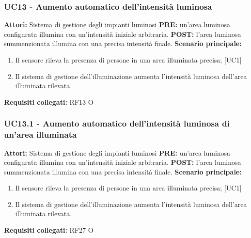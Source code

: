 \documentclass[a4paper, 12pt]{article}
\begin{document}
\subsubsection{UC13 - Aumento automatico dell'intensità luminosa}
\textbf{Attori:} Sistema di gestione degli impianti luminosi \newline
\textbf{PRE:} un'area luminosa configurata illumina con un'intensità iniziale arbitraria.\newline
\textbf{POST:} l'area luminosa summenzionata illumina con una precisa intensità finale.\newline
\textbf{Scenario principale:}
\begin{enumerate}
    \item Il sensore rileva la presenza di persone in una area illuminata precisa; [UC1]
    \item Il sistema di gestione dell'illuminazione aumenta l'intensità luminosa dell'area illuminata rilevata.
\end{enumerate}
\textbf{Requisiti collegati:} RF13-O\newline

\subsubsection{UC13.1 - Aumento automatico dell'intensità luminosa di un'area illuminata}
\textbf{Attori:} Sistema di gestione degli impianti luminosi \newline
\textbf{PRE:} un'area luminosa configurata illumina con un'intensità iniziale arbitraria.\newline
\textbf{POST:} l'area luminosa summenzionata illumina con una precisa intensità finale.\newline
\textbf{Scenario principale:}
\begin{enumerate}
    \item Il sensore rileva la presenza di persone in una area illuminata precisa; [UC1]
    \item Il sistema di gestione dell'illuminazione aumenta l'intensità luminosa dell'area illuminata rilevata.
\end{enumerate}
\textbf{Requisiti collegati:} RF27-O\newline
\end{document}
